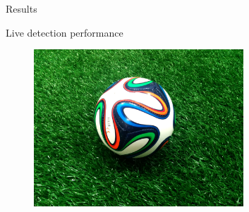\begin{frame}{Results}
	\begin{figure}
		\centering
		\label{fig:trial_comparison_charts}
	\end{figure}
\end{frame}

\begin{frame}{Live detection performance}
	\begin{figure}
	  \centering
	  \includegraphics[width=0.7\textwidth]{images/fifa_ball}
	  \label{fig:fifa_ball}
	\end{figure}
\end{frame}

